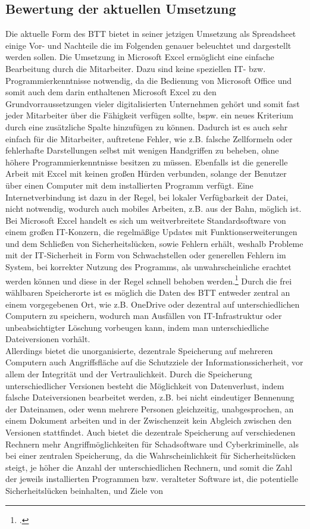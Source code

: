 \subsection{Bewertung der aktuellen Umsetzung}
Die aktuelle Form des BTT bietet in seiner jetzigen Umsetzung als Spreadsheet einige Vor- und Nachteile die im Folgenden genauer beleuchtet und dargestellt werden sollen. Die Umsetzung in Microsoft Excel ermöglicht eine einfache Bearbeitung durch die Mitarbeiter. Dazu sind keine speziellen IT- bzw. Programmierkenntnisse notwendig, da die Bedienung von Microsoft Office und somit auch dem darin enthaltenen Microsoft Excel zu den Grundvorraussetzungen vieler digitalisierten Unternehmen gehört und somit fast jeder Mitarbeiter über die Fähigkeit verfügen sollte, bspw. ein neues Kriterium durch eine zusätzliche Spalte hinzufügen zu können. Dadurch ist es auch sehr einfach für die Mitarbeiter, auftretene Fehler, wie z.B. falsche Zellformeln oder fehlerhafte Darstellungen selbst mit wenigen Handgriffen zu beheben, ohne höhere Programmierkenntnisse besitzen zu müssen. Ebenfalls ist die generelle Arbeit mit Excel mit keinen großen Hürden verbunden, solange der Benutzer über einen Computer mit dem installierten Programm verfügt. Eine Internetverbindung ist dazu in der Regel, bei lokaler Verfügbarkeit der Datei, nicht notwendig, wodurch auch mobiles Arbeiten, z.B. aus der Bahn, möglich ist.\\Bei Microsoft Excel handelt es sich um weitverbreitete Standardsoftware von einem großen IT-Konzern, die regelmäßige Updates mit Funktionserweiterungen und dem Schließen von Sicherheitslücken, sowie Fehlern erhält, weshalb Probleme mit der IT-Sicherheit in Form von Schwachstellen oder generellen Fehlern im System, bei korrekter Nutzung des Programms, als unwahrscheinliche erachtet werden können und diese in der Regel schnell behoben werden.\footcite[Vgl.][]{ms-sicherheit} Durch die frei wählbaren Speicherorte ist es möglich die Daten des BTT entweder zentral an einem vorgegebenen Ort, wie z.B. OneDrive oder dezentral auf unterschiedlichen Computern zu speichern, wodurch man Ausfällen von IT-Infrastruktur oder unbeabsichtigter Löschung vorbeugen kann, indem man unterschiedliche Dateiversionen vorhält.\\Allerdings bietet die unorganisierte, dezentrale Speicherung auf mehreren Computern auch Angriffsfläche auf die Schutzziele der Informationssicherheit, vor allem der Integrität und der Vertraulichkeit. Durch die Speicherung unterschiedlicher Versionen besteht die Möglichkeit von Datenverlust, indem falsche Dateiversionen bearbeitet werden, z.B. bei nicht eindeutiger Bennenung der Dateinamen, oder wenn mehrere Personen gleichzeitig, unabgesprochen, an einem Dokument arbeiten und in der Zwischenzeit kein Abgleich zwischen den Versionen stattfindet. Auch bietet die dezentrale Speicherung auf verschiedenen Rechnern mehr Angriffmöglichkeiten für Schadsoftware und Cyberkriminelle, als bei einer zentralen Speicherung, da die Wahrscheinlichkeit für Sicherheitslücken steigt, je höher die Anzahl der unterschiedlichen Rechnern, und somit die Zahl der jeweils installierten Programmen bzw. veralteter Software ist, die potentielle Sicherheitslücken beinhalten, und Ziele von 